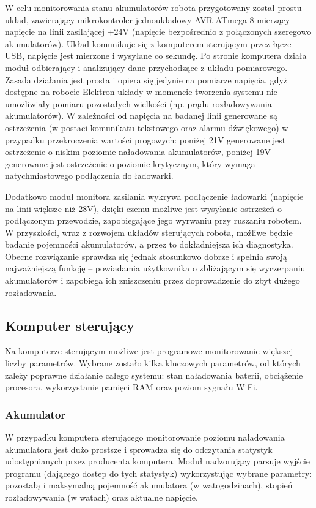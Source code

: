 W celu monitorowania stanu akumulatorów robota przygotowany został prostu układ,
zawierający mikrokontroler jednoukładowy AVR ATmega 8 mierzący napięcie na linii
zasilającej +24V (napięcie bezpośrednio z połączonych szeregowo akumulatorów).
Układ komunikuje się z komputerem sterującym przez łącze USB, napięcie jest
mierzone i wysyłane co sekundę. Po stronie komputera działa moduł odbierający i
analizujący dane przychodzące z układu pomiarowego. Zasada działania jest prosta
i opiera się jedynie na pomiarze napięcia, gdyż dostępne na robocie Elektron
układy w momencie tworzenia systemu nie umożliwiały pomiaru pozostałych
wielkości (np. prądu rozładowywania akumulatorów). W zależności od napięcia na
badanej linii generowane są ostrzeżenia (w postaci komunikatu tekstowego oraz
alarmu dźwiękowego) w przypadku przekroczenia wartości progowych: poniżej 21V
generowane jest ostrzeżenie o niskim poziomie naładowania akumulatorów, poniżej
19V generowane jest ostrzeżenie o poziomie krytycznym, który wymaga
natychmiastowego podłączenia do ładowarki.

Dodatkowo moduł monitora zasilania wykrywa podłączenie ładowarki (napięcie na
linii większe niż 28V), dzięki czemu możliwe jest wysyłanie ostrzeżeń o
podłączonym przewodzie, zapobiegające jego wyrwaniu przy ruszaniu robotem. W
przyszłości, wraz z rozwojem układów sterujących robota, możliwe będzie badanie
pojemności akumulatorów, a przez to dokładniejsza ich diagnostyka. Obecne 
rozwiązanie sprawdza się jednak stosunkowo dobrze i spełnia swoją najważniejszą
funkcję -- powiadamia użytkownika o zbliżającym się wyczerpaniu akumulatorów i
zapobiega ich zniszczeniu przez doprowadzenie do zbyt dużego rozładowania.

\subsection{Komputer sterujący}

Na komputerze sterującym możliwe jest programowe monitorowanie większej liczby
parametrów. Wybrane zostało kilka kluczowych parametrów, od których zależy
poprawne działanie całego systemu: stan naładowania baterii, obciążenie
procesora, wykorzystanie pamięci RAM oraz poziom sygnału WiFi.

\subsubsection{Akumulator}

W przypadku komputera sterującego monitorowanie poziomu naładowania akumulatora
jest dużo prostsze i sprowadza się do odczytania statystyk udostępnianych przez
producenta komputera. Moduł nadzorujący parsuje wyjście programu 
(dającego dostep do tych statystyk) wykorzystując wybrane parametry: pozostałą i
maksymalną pojemność akumulatora (w watogodzinach), stopień rozładowywania (w
watach) oraz aktualne napięcie.

